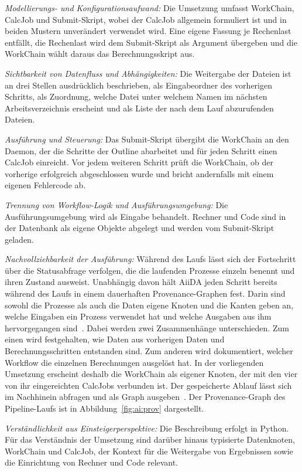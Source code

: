\emph{Modellierungs- und Konfigurationsaufwand:} Die Umsetzung
umfasst WorkChain, CalcJob und Submit-Skript, wobei der CalcJob
allgemein formuliert ist und in beiden Mustern unverändert verwendet
wird. Eine eigene Fassung je Rechenlast entfällt, die Rechenlast wird
dem Submit-Skript als Argument übergeben und die WorkChain wählt
daraus das Berechnungsskript aus.

\emph{Sichtbarkeit von Datenfluss und Abhängigkeiten:} Die Weitergabe
der Dateien ist an drei Stellen ausdrücklich beschrieben, als
Eingabeordner des vorherigen Schritts, als Zuordnung, welche Datei
unter welchem Namen im nächsten Arbeitsverzeichnis erscheint und als
Liste der nach dem Lauf abzurufenden Dateien.

\emph{Ausführung und Steuerung:} Das Submit-Skript übergibt die
WorkChain an den Daemon, der die Schritte der Outline abarbeitet und
für jeden Schritt einen CalcJob einreicht. Vor jedem weiteren Schritt
prüft die WorkChain, ob der vorherige erfolgreich abgeschlossen
wurde und bricht andernfalls mit einem eigenen Fehlercode ab.

\emph{Trennung von Workflow-Logik und Ausführungsumgebung:} Die
Ausführungsumgebung wird als Eingabe behandelt. Rechner und Code sind
in der Datenbank als eigene Objekte abgelegt und werden vom
Submit-Skript geladen.


\emph{Nachvollziehbarkeit der Ausführung:} Während des Laufs lässt
sich der Fortschritt über die Statusabfrage verfolgen, die die
laufenden Prozesse einzeln benennt und ihren Zustand ausweist. Unabhängig davon hält AiiDA jeden Schritt bereits während des Laufs in einem dauerhaften
Provenance-Graphen fest. Darin sind sowohl die Prozesse als auch die
Daten eigene Knoten und die Kanten geben an, welche Eingaben ein
Prozess verwendet hat und welche Ausgaben aus ihm hervorgegangen
sind~\cite[S.~7\,f.]{huber2020aiida}. Dabei werden zwei Zusammenhänge unterschieden. Zum einen wird festgehalten, wie Daten aus vorherigen Daten und Berechnungsschritten entstanden sind. Zum anderen wird dokumentiert, welcher Workflow die einzelnen Berechnungen ausgelöst hat. In der vorliegenden Umsetzung erscheint deshalb die WorkChain als
eigener Knoten, der mit den vier von ihr eingereichten CalcJobs
verbunden ist. Der gespeicherte Ablauf lässt sich im
Nachhinein abfragen und als Graph ausgeben~\cite{aiidadocs-graph}. Der
Provenance-Graph des Pipeline-Laufs ist in
Abbildung~\ref{fig:ai:prov} dargestellt.

\emph{Verständlichkeit aus Einsteigerperspektive:} Die Beschreibung
erfolgt in Python. Für das Verständnis der Umsetzung sind darüber
hinaus typisierte Datenknoten, WorkChain und CalcJob, der Kontext für
die Weitergabe von Ergebnissen sowie die Einrichtung von Rechner und
Code relevant.

